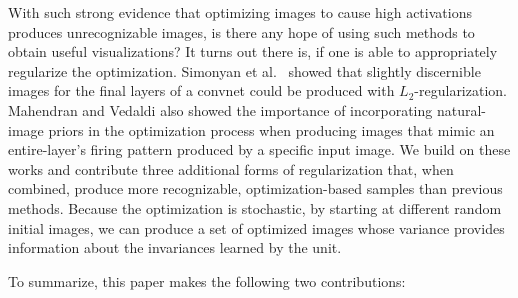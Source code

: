 \documentclass{article}
\begin{document}
With such strong evidence that optimizing images to cause high activations produces unrecognizable images, is there any hope of using such methods to obtain useful visualizations? It turns out there is, if one is able to appropriately regularize the optimization. Simonyan et al.~ showed that slightly discernible images for the final layers of a convnet could be produced with $L_2$-regularization. Mahendran and Vedaldi  also showed the importance of incorporating natural-image priors in the optimization process when producing images that mimic an entire-layer's firing pattern produced by a specific input image. We build on these works and contribute three additional forms of regularization that, when combined, produce more recognizable, optimization-based samples than previous methods. Because the optimization is stochastic, by starting at different random initial images, we can produce a set of optimized images whose variance provides information about the invariances learned by the unit.

To summarize, this paper makes the following two contributions:
\end{document}
